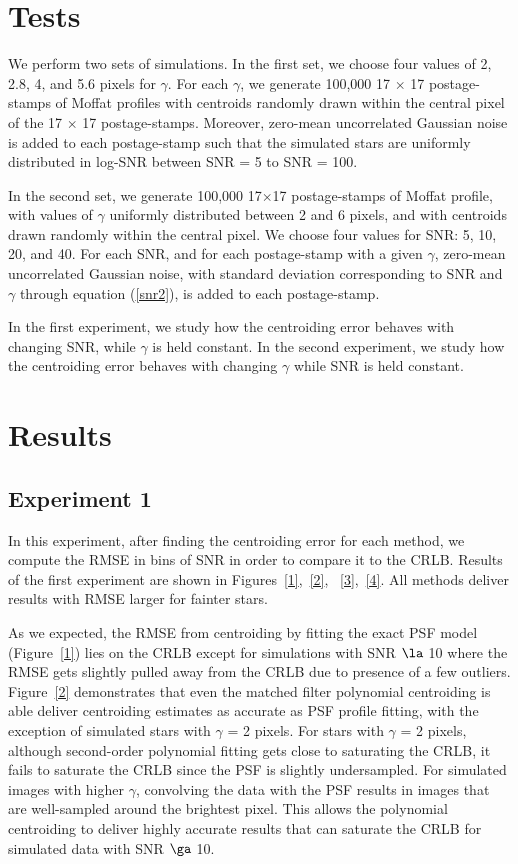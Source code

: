 \documentclass[12pt, preprint]{aastex}
\begin{document}
\section{Tests}\label{sec:data}

We perform two sets of simulations. In the first set, we choose four values of
2, 2.8, 4, and 5.6 pixels for $\gamma$. For each $\gamma$, we generate 100,000 
17 $\times$ 17 postage-stamps of Moffat profiles with centroids randomly drawn
within the central pixel of the 17 $\times$ 17 postage-stamps. Moreover, zero-mean 
uncorrelated Gaussian noise is added to each postage-stamp such that the simulated 
stars are uniformly distributed in log-SNR between SNR = 5 to SNR = 100.

In the second set, we generate 100,000 17$\times$17 postage-stamps
of Moffat profile, with values of $\gamma$ uniformly distributed 
between 2 and 6 pixels, and with centroids drawn randomly within 
the central pixel. We choose four values for SNR: 5, 10, 20, and 40. 
For each SNR, and for each postage-stamp with a given $\gamma$, 
zero-mean uncorrelated Gaussian noise, with standard deviation corresponding 
to SNR and $\gamma$ through equation (\ref{snr2}), is added to each postage-stamp.

In the first experiment, we study how the centroiding error behaves with changing
SNR, while $\gamma$ is held constant. In the second experiment, we study 
how the centroiding error behaves with changing $\gamma$ while SNR is held constant.

\section{Results}\label{sec:result}

\subsection{Experiment 1}
   
In this experiment, after finding the centroiding error for each method,
we compute the RMSE in bins of SNR in order to compare it to the CRLB. 
Results of the first experiment are shown in Figures~\ref{1},~\ref{2},
~\ref{3},~\ref{4}. All methods deliver results with RMSE larger 
for fainter stars.

As we expected, the RMSE from centroiding by fitting the exact PSF model (Figure~\ref{1})
lies on the CRLB except for simulations with SNR $\la$ 10 where the RMSE gets slightly pulled away
from the CRLB due to presence of a few outliers. Figure~\ref{2} demonstrates that even the matched filter polynomial 
centroiding is able deliver centroiding estimates as accurate as PSF profile fitting, with the exception
of simulated stars with $\gamma$ = 2 pixels. For stars with $\gamma$ = 2 pixels, although second-order polynomial
fitting gets close to saturating the CRLB, it fails to saturate the CRLB since the PSF is slightly undersampled. 
For simulated images with higher $\gamma$, convolving the
data with the PSF results in images that are well-sampled around the brightest pixel. This allows the 
polynomial centroiding to deliver highly accurate results that can saturate the CRLB for simulated
data with SNR $\ga$ 10.
\end{document}
